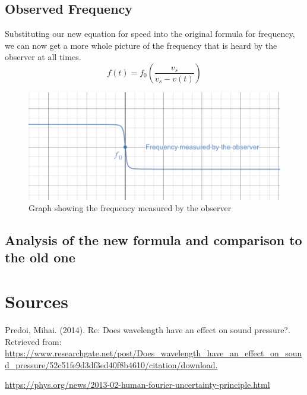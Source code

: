 \documentclass[12pt]{article}
\begin{document}
\subsection{Observed Frequency}

Substituting our new equation for speed into the original formula for frequency, we can now get a more whole picture of the frequency that is heard by the observer at all times.  $$f(t) = f_0 \left( \frac{v_s}{v_s - v(t)} \right) $$

\begin{figure}[H]
	\centering
	\includegraphics[width=5in]{frequency}
	\caption{Graph showing the frequency measured by the observer}
	\label{fig:frequency}
\end{figure}

\subsection{Analysis of the new formula and comparison to the old one}


\section{Sources}

Predoi, Mihai. (2014). Re: Does wavelength have an effect on sound pressure?. Retrieved from: \url{ https://www.researchgate.net/post/Does_wavelength_have_an_effect_on_sound_pressure/52c51fe9d3df3ed40f8b4610/citation/download. }

\url{https://phys.org/news/2013-02-human-fourier-uncertainty-principle.html}
\end{document}
